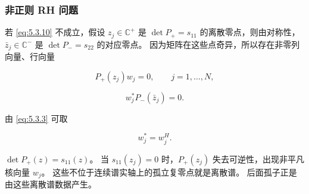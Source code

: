 \documentclass[
    lang=cn,
    scheme=chinese,
    mode=simple,
    device=normal,
    color=blue,
    math=cm,
    thmcnt=section,
    12pt
]{elegantbook}
\begin{document}
\subsubsection{非正则 RH 问题}

若 \eqref{eq:5.3.10} 不成立，假设 $z_j\in\mathbb{C}^+$ 是 $\det P_+=s_{11}$ 的离散零点，则由对称性，$\bar z_j\in\mathbb{C}^-$ 是 $\det P_-=s_{22}$ 的对应零点。
因为矩阵在这些点奇异，所以存在非零列向量、行向量

\begin{equation}
    P_+(z_j)w_j=0,
    \qquad j=1,\ldots,N,
    \tag{5.3.11}
    \label{eq:5.3.11}
\end{equation}

\begin{equation}
    w_j^*P_-(\bar z_j)=0.
    \tag{5.3.12}
    \label{eq:5.3.12}
\end{equation}

由 \eqref{eq:5.3.3} 可取

\begin{equation}
    w_j^*=w_j^H.
    \tag{5.3.13}
    \label{eq:5.3.13}
\end{equation}

\begin{callout}
    $\det P_+(z)=s_{11}(z)$。
    当 $s_{11}(z_j)=0$ 时，$P_+(z_j)$ 失去可逆性，出现非平凡核向量 $w_j$。
    这些不位于连续谱实轴上的孤立复零点就是离散谱。
    后面孤子正是由这些离散谱数据产生。
\end{callout}
\end{document}
